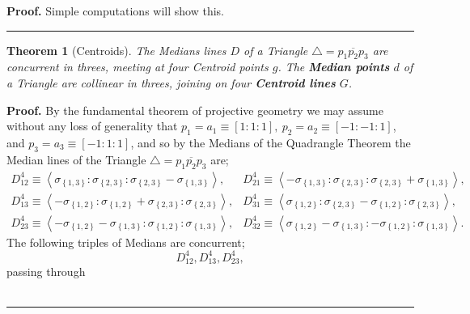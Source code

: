 \documentclass{unswthesis}
\newtheorem{theorem}{Theorem}
\newenvironment{proof}[1][Proof]{\noindent\textbf{#1.} }{\ \rule{0.5em}{0.5em}}
\begin{document}
\begin{proof}
Simple computations will show this.
\end{proof}

\begin{theorem}[Centroids]
The Medians lines $D$ of a Triangle $\triangle =\overline{p_{1}p_{2}p_{3}}$
are concurrent in threes, meeting at four Centroid points $g$. The \textbf{%
Median points} $d$ of a Triangle are collinear in threes, joining on four 
\textbf{Centroid lines} $G$.
\end{theorem}

\begin{proof}
By the fundamental theorem of projective geometry we may assume without any
loss of generality that $p_{1}=a_{1}\equiv \left[ 1:1:1\right]
,~p_{2}=a_{2}\equiv \left[ -1:-1:1\right] $, and $p_{3}=a_{3}\equiv \left[
-1:1:1\right] $, and so by the Medians of the Quadrangle Theorem the Median
lines of the Triangle $\triangle =\overline{p_{1}p_{2}p_{3}}$ are; 
\begin{equation*}
\begin{array}{cc}
D_{12}^{4}\equiv \left\langle \sigma _{\left\{ 1,3\right\} }:\sigma
_{\left\{ 2,3\right\} }:\sigma _{\left\{ 2,3\right\} }-\sigma _{\left\{
1,3\right\} }\right\rangle , & D_{21}^{4}\equiv \left\langle -\sigma
_{\left\{ 1,3\right\} }:\sigma _{\left\{ 2,3\right\} }:\sigma _{\left\{
2,3\right\} }+\sigma _{\left\{ 1,3\right\} }\right\rangle , \\ 
D_{13}^{4}\equiv \left\langle -\sigma _{\left\{ 1,2\right\} }:\sigma
_{\left\{ 1,2\right\} }+\sigma _{\left\{ 2,3\right\} }:\sigma _{\left\{
2,3\right\} }\right\rangle , & D_{31}^{4}\equiv \left\langle \sigma
_{\left\{ 1,2\right\} }:\sigma _{\left\{ 2,3\right\} }-\sigma _{\left\{
1,2\right\} }:\sigma _{\left\{ 2,3\right\} }\right\rangle , \\ 
D_{23}^{4}\equiv \left\langle -\sigma _{\left\{ 1,2\right\} }-\sigma
_{\left\{ 1,3\right\} }:\sigma _{\left\{ 1,2\right\} }:\sigma _{\left\{
1,3\right\} }\right\rangle , & D_{32}^{4}\equiv \left\langle \sigma
_{\left\{ 1,2\right\} }-\sigma _{\left\{ 1,3\right\} }:-\sigma _{\left\{
1,2\right\} }:\sigma _{\left\{ 1,3\right\} }\right\rangle .%
\end{array}%
\end{equation*}%
The following triples of Medians are concurrent;%
\begin{equation*}
D_{12}^{4},D_{13}^{4},D_{23}^{4}, 
\end{equation*}%
passing through 
\begin{equation*}

\end{equation*}
\end{proof}
\end{document}
